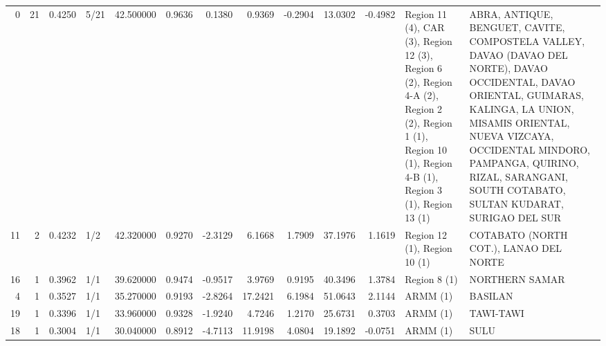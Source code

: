 \begin{tabular}{rrrlrrrrrrrll}
0 & 21 & {\cellcolor[HTML]{F2CBB7}} \color[HTML]{000000} 0.4250 & 5/21 & {\cellcolor[HTML]{F2CBB7}} \color[HTML]{000000} 42.500000 & 0.9636 & 0.1380 & 0.9369 & -0.2904 & 13.0302 & -0.4982 & Region 11 (4), CAR (3), Region 12 (3), Region 6 (2), Region 4-A (2), Region 2 (2), Region 1 (1), Region 10 (1), Region 4-B (1), Region 3 (1), Region 13 (1) & ABRA, ANTIQUE, BENGUET, CAVITE, COMPOSTELA VALLEY, DAVAO (DAVAO DEL NORTE), DAVAO OCCIDENTAL, DAVAO ORIENTAL, GUIMARAS, KALINGA, LA UNION, MISAMIS ORIENTAL, NUEVA VIZCAYA, OCCIDENTAL MINDORO, PAMPANGA, QUIRINO, RIZAL, SARANGANI, SOUTH COTABATO, SULTAN KUDARAT, SURIGAO DEL SUR \\
11 & 2 & {\cellcolor[HTML]{F1CDBA}} \color[HTML]{000000} 0.4232 & 1/2 & {\cellcolor[HTML]{F1CDBA}} \color[HTML]{000000} 42.320000 & 0.9270 & -2.3129 & 6.1668 & 1.7909 & 37.1976 & 1.1619 & Region 12 (1), Region 10 (1) & COTABATO (NORTH COT.), LANAO DEL NORTE \\
16 & 1 & {\cellcolor[HTML]{D3DBE7}} \color[HTML]{000000} 0.3962 & 1/1 & {\cellcolor[HTML]{D3DBE7}} \color[HTML]{000000} 39.620000 & 0.9474 & -0.9517 & 3.9769 & 0.9195 & 40.3496 & 1.3784 & Region 8 (1) & NORTHERN SAMAR \\
4 & 1 & {\cellcolor[HTML]{8DB0FE}} \color[HTML]{000000} 0.3527 & 1/1 & {\cellcolor[HTML]{8DB0FE}} \color[HTML]{000000} 35.270000 & 0.9193 & -2.8264 & 17.2421 & 6.1984 & 51.0643 & 2.1144 & ARMM (1) & BASILAN \\
19 & 1 & {\cellcolor[HTML]{779AF7}} \color[HTML]{F1F1F1} 0.3396 & 1/1 & {\cellcolor[HTML]{779AF7}} \color[HTML]{F1F1F1} 33.960000 & 0.9328 & -1.9240 & 4.7246 & 1.2170 & 25.6731 & 0.3703 & ARMM (1) & TAWI-TAWI \\
18 & 1 & {\cellcolor[HTML]{3B4CC0}} \color[HTML]{F1F1F1} 0.3004 & 1/1 & {\cellcolor[HTML]{3B4CC0}} \color[HTML]{F1F1F1} 30.040000 & 0.8912 & -4.7113 & 11.9198 & 4.0804 & 19.1892 & -0.0751 & ARMM (1) & SULU \\
\bottomrule
\end{tabular}
